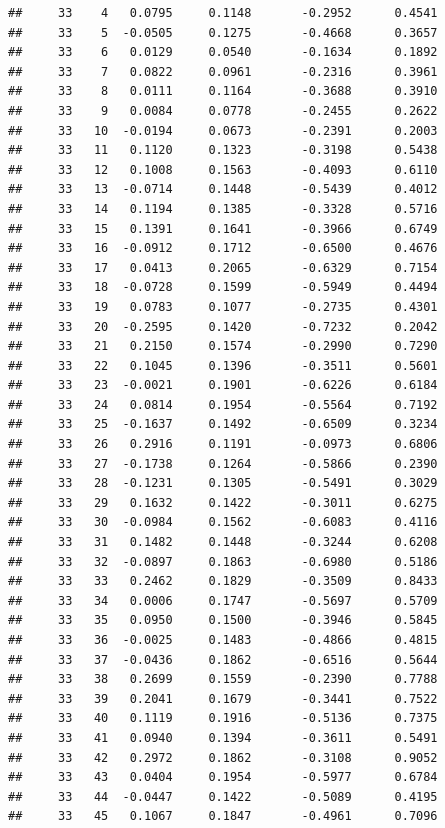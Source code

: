 \documentclass[
]{article}
\begin{document}
\begin{verbatim}
##     33    4   0.0795     0.1148       -0.2952      0.4541  
##     33    5  -0.0505     0.1275       -0.4668      0.3657  
##     33    6   0.0129     0.0540       -0.1634      0.1892  
##     33    7   0.0822     0.0961       -0.2316      0.3961  
##     33    8   0.0111     0.1164       -0.3688      0.3910  
##     33    9   0.0084     0.0778       -0.2455      0.2622  
##     33   10  -0.0194     0.0673       -0.2391      0.2003  
##     33   11   0.1120     0.1323       -0.3198      0.5438  
##     33   12   0.1008     0.1563       -0.4093      0.6110  
##     33   13  -0.0714     0.1448       -0.5439      0.4012  
##     33   14   0.1194     0.1385       -0.3328      0.5716  
##     33   15   0.1391     0.1641       -0.3966      0.6749  
##     33   16  -0.0912     0.1712       -0.6500      0.4676  
##     33   17   0.0413     0.2065       -0.6329      0.7154  
##     33   18  -0.0728     0.1599       -0.5949      0.4494  
##     33   19   0.0783     0.1077       -0.2735      0.4301  
##     33   20  -0.2595     0.1420       -0.7232      0.2042  
##     33   21   0.2150     0.1574       -0.2990      0.7290  
##     33   22   0.1045     0.1396       -0.3511      0.5601  
##     33   23  -0.0021     0.1901       -0.6226      0.6184  
##     33   24   0.0814     0.1954       -0.5564      0.7192  
##     33   25  -0.1637     0.1492       -0.6509      0.3234  
##     33   26   0.2916     0.1191       -0.0973      0.6806  
##     33   27  -0.1738     0.1264       -0.5866      0.2390  
##     33   28  -0.1231     0.1305       -0.5491      0.3029  
##     33   29   0.1632     0.1422       -0.3011      0.6275  
##     33   30  -0.0984     0.1562       -0.6083      0.4116  
##     33   31   0.1482     0.1448       -0.3244      0.6208  
##     33   32  -0.0897     0.1863       -0.6980      0.5186  
##     33   33   0.2462     0.1829       -0.3509      0.8433  
##     33   34   0.0006     0.1747       -0.5697      0.5709  
##     33   35   0.0950     0.1500       -0.3946      0.5845  
##     33   36  -0.0025     0.1483       -0.4866      0.4815  
##     33   37  -0.0436     0.1862       -0.6516      0.5644  
##     33   38   0.2699     0.1559       -0.2390      0.7788  
##     33   39   0.2041     0.1679       -0.3441      0.7522  
##     33   40   0.1119     0.1916       -0.5136      0.7375  
##     33   41   0.0940     0.1394       -0.3611      0.5491  
##     33   42   0.2972     0.1862       -0.3108      0.9052  
##     33   43   0.0404     0.1954       -0.5977      0.6784  
##     33   44  -0.0447     0.1422       -0.5089      0.4195  
##     33   45   0.1067     0.1847       -0.4961      0.7096  

\end{verbatim}
\end{document}
